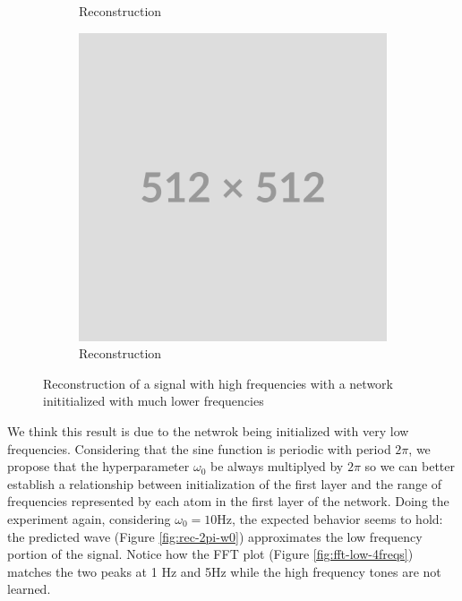 \begin{figure}
\begin{subfigure}[b]{0.3\textwidth}
        \caption{Reconstruction}
        \label{fig:rec-naive-w0}
    \end{subfigure}
    \hfill
    \begin{subfigure}[b]{0.3\textwidth}
        \centering
        \includegraphics[width=\textwidth]{img/placeholder512.png}
        \caption{Reconstruction}
        \label{fig:fft-smooth-4freqs}
    \end{subfigure}
    \label{f:4freqs-smoothed-reconstruction}
    \caption{Reconstruction of a signal with high frequencies with a network inititialized with much lower frequencies}
\end{figure}

We think this result is due to the netwrok being initialized with very low frequencies. Considering that the sine function is periodic with period $2\pi$, we propose that the hyperparameter $\omega_0$ be always multiplyed by $2\pi$ so we can better establish a relationship between initialization of the first layer and the range of frequencies represented by each atom in the first layer of the network.
Doing the experiment again, considering $\omega_0 = 10$Hz, the expected behavior seems to hold: the predicted wave (Figure \ref{fig:rec-2pi-w0}) approximates the low frequency portion of the signal. Notice how the FFT plot (Figure \ref{fig:fft-low-4freqs}) matches the two peaks at 1 Hz and 5Hz while the high frequency tones are not learned.

